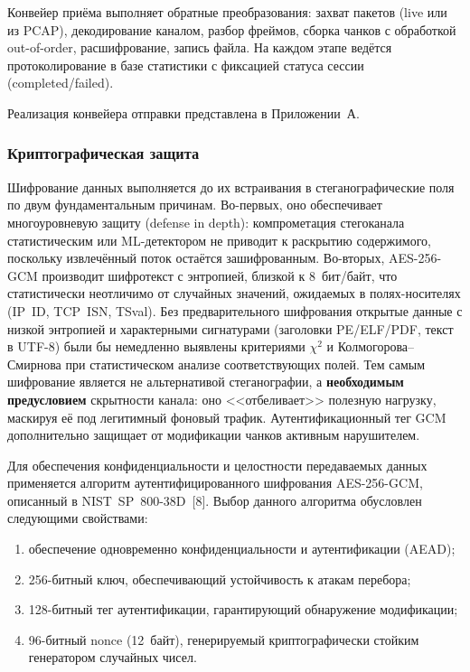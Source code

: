 Конвейер приёма выполняет обратные преобразования: захват пакетов (live или из PCAP), декодирование каналом, разбор фреймов, сборка чанков с обработкой out-of-order, расшифрование, запись файла. На каждом этапе ведётся протоколирование в базе статистики с фиксацией статуса сессии (completed/failed).

Реализация конвейера отправки представлена в Приложении~А.

\subsubsection{Криптографическая защита}

Шифрование данных выполняется до их встраивания в стеганографические поля по двум фундаментальным причинам. Во-первых, оно обеспечивает многоуровневую защиту (defense in depth): компрометация стегоканала статистическим или ML-детектором не приводит к раскрытию содержимого, поскольку извлечённый поток остаётся зашифрованным. Во-вторых, AES-256-GCM производит шифротекст с энтропией, близкой к 8~бит/байт, что статистически неотличимо от случайных значений, ожидаемых в полях-носителях (IP~ID, TCP~ISN, TSval). Без предварительного шифрования открытые данные с низкой энтропией и характерными сигнатурами (заголовки PE/ELF/PDF, текст в UTF-8) были бы немедленно выявлены критериями $\chi^2$ и Колмогорова--Смирнова при статистическом анализе соответствующих полей. Тем самым шифрование является не альтернативой стеганографии, а \textbf{необходимым предусловием} скрытности канала: оно <<отбеливает>> полезную нагрузку, маскируя её под легитимный фоновый трафик. Аутентификационный тег GCM дополнительно защищает от модификации чанков активным нарушителем.

Для обеспечения конфиденциальности и целостности передаваемых данных применяется алгоритм аутентифицированного шифрования AES-256-GCM, описанный в NIST~SP~800-38D~[8]. Выбор данного алгоритма обусловлен следующими свойствами:

\begin{enumerate}[label=\arabic*)]
    \item обеспечение одновременно конфиденциальности и аутентификации (AEAD);
    \item 256-битный ключ, обеспечивающий устойчивость к атакам перебора;
    \item 128-битный тег аутентификации, гарантирующий обнаружение модификации;
    \item 96-битный nonce (12~байт), генерируемый криптографически стойким генератором случайных чисел.
\end{enumerate}


